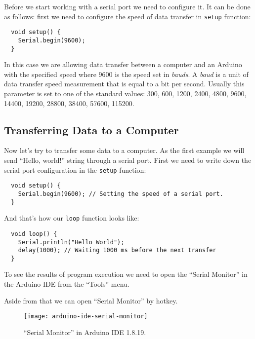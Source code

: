 \documentclass[../sparc.tex]{subfiles}
\begin{document}
Before we start working with a serial port we need to configure it.  It can be
done as follows: first we need to configure the speed of data transfer in
\texttt{setup} function:

\begin{verbatim}
  void setup() {
    Serial.begin(9600);
  }
\end{verbatim}

In this case we are allowing data transfer between a computer and an Arduino
with the specified speed where 9600 is the speed set in \emph{bauds}.  A
\emph{baud} is a unit of data transfer speed measurement that is equal to a bit
per second.  Usually this parameter is set to one of the standard values: 300,
600, 1200, 2400, 4800, 9600, 14400, 19200, 28800, 38400, 57600, 115200.

\subsection{Transferring Data to a Computer}

Now let's try to transfer some data to a computer.  As the first example we will
send ``Hello, world!'' string through a serial port.  First we need to write
down the serial port configuration in the \texttt{setup} function:

\begin{verbatim}
  void setup() {
    Serial.begin(9600); // Setting the speed of a serial port.
  }
\end{verbatim}

And that's how our \texttt{loop} function looks like:

\begin{verbatim}
  void loop() {
    Serial.println("Hello World");
    delay(1000); // Waiting 1000 ms before the next transfer
  }
\end{verbatim}

To see the results of program execution we need to open the ``Serial Monitor''
in the Arduino IDE from the ``Tools'' menu.

Aside from that we can open ``Serial Monitor'' by 
hotkey.

\begin{figure}[ht]
  \centering
  \texttt{[image: arduino-ide-serial-monitor]}
  \caption{``Serial Monitor'' in Arduino IDE 1.8.19.}
  \label{fig:arduino-ide-serial-monitor}
\end{figure}
\end{document}
